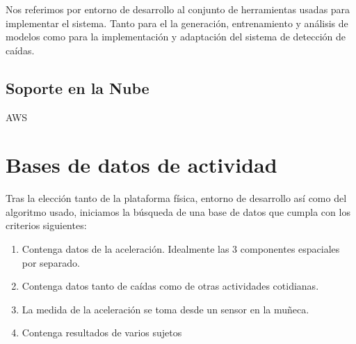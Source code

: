 Nos referimos por entorno de desarrollo al conjunto de herramientas usadas para implementar el sistema. Tanto para el la generación, entrenamiento y análisis de modelos como para la implementación y adaptación del sistema de detección de caídas.



\subsection{Soporte en la Nube}
AWS


\section{Bases de datos de actividad}\label{sec:req:bases_datos}

Tras la elección tanto de la plataforma física, entorno de desarrollo así como del algoritmo usado, iniciamos la búsqueda de una base de datos que cumpla con los criterios siguientes:

\begin{enumerate}
  \item Contenga datos de la aceleración. Idealmente las 3 componentes espaciales por separado.
  \item Contenga datos tanto de caídas como de otras actividades cotidianas.
  \item La medida de la aceleración se toma desde un sensor en la muñeca.
  \item Contenga resultados de varios sujetos
\end{enumerate}


